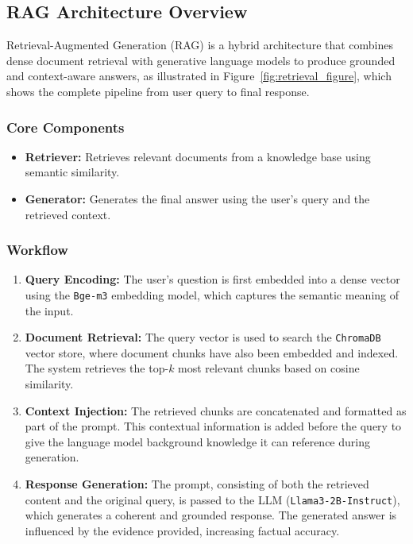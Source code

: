 \subsection{RAG Architecture Overview}
\label{subsec:rag-architecture}

Retrieval-Augmented Generation (RAG) is a hybrid architecture that combines dense document retrieval with generative language models to produce grounded and context-aware answers, as illustrated in Figure~\ref{fig:retrieval_figure}, which shows the complete pipeline from user query to final response.


\subsubsection*{Core Components}
\begin{itemize}
    \item \textbf{Retriever:} Retrieves relevant documents from a knowledge base using semantic similarity.
    \item \textbf{Generator:} Generates the final answer using the user's query and the retrieved context.
\end{itemize}

\subsubsection*{Workflow}
\begin{enumerate}
    \item \textbf{Query Encoding:}
    The user's question is first embedded into a dense vector using the \texttt{Bge-m3} embedding model, which captures the semantic meaning of the input.
    
    \item \textbf{Document Retrieval:}
    The query vector is used to search the \texttt{ChromaDB} vector store, where document chunks have also been embedded and indexed. The system retrieves the top-$k$ most relevant chunks based on cosine similarity.
    
    \item \textbf{Context Injection:}
    The retrieved chunks are concatenated and formatted as part of the prompt. This contextual information is added before the query to give the language model background knowledge it can reference during generation.
    
    \item \textbf{Response Generation:}
    The prompt, consisting of both the retrieved content and the original query, is passed to the LLM (\texttt{Llama3-2B-Instruct}), which generates a coherent and grounded response. The generated answer is influenced by the evidence provided, increasing factual accuracy.
\end{enumerate}

